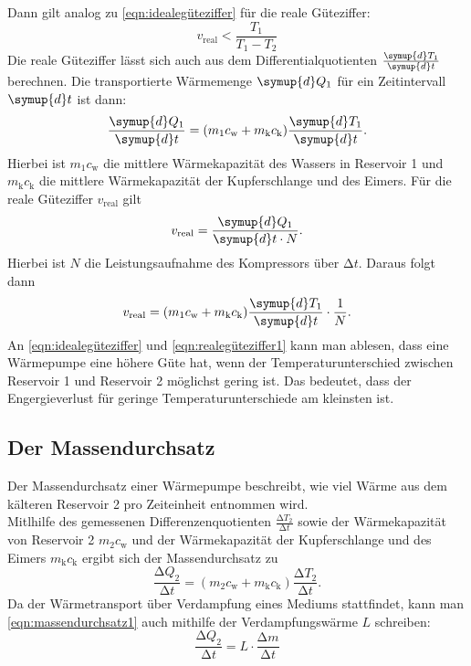 \documentclass{scrartcl} %
\begin{document}
	Dann gilt analog zu \eqref{eqn:idealegüteziffer} für die reale Güteziffer:
	\begin{equation}
		v_\text{real} < \frac{T_\text{1}}{T_\text{1}-T_\text{2}}
		\label{eqn:realegüteziffer1}
	\end{equation}
  Die reale Güteziffer lässt sich auch aus dem Differentialquotienten $ \frac{\symup{d} T_\text{1}}{ \symup{d} t}$ berechnen. Die transportierte Wärmemenge $\symup{d} Q_\text{1}$
  für ein Zeitintervall $\symup{d} t$ ist dann:
  \begin{equation}
    \frac{\symup{d} Q_\text{1}}{\symup{d} t} = (m_\text{1}c_\text{w} + m_\text{k}c_\text{k}) \frac{\symup{d} T_\text{1}}{\symup{d} t}.
    \label{eqn:realegüteziffer2}
  \end{equation}
  Hierbei ist $m_\text{1}c_\text{w}$ die mittlere Wärmekapazität des Wassers in Reservoir 1 und $m_\text{k}c_\text{k}$ die mittlere Wärmekapazität der Kupferschlange und des Eimers.
  Für die reale Güteziffer $v_\text{real}$ gilt
  \begin{equation}
    v_\text{real} = \frac{\symup{d} Q_\text{1}}{\symup{d} t \cdot N}.
  \end{equation}
  Hierbei ist $N$ die Leistungsaufnahme des Kompressors über $\increment t$. Daraus folgt dann
  \begin{equation}
    v_\text{real} = (m_\text{1}c_\text{w} + m_\text{k}c_\text{k}) \frac{\symup{d} T_\text{1}}{\symup{d} t} \cdot \frac{1}{N}.
    \label{eqn:realegüteziffer3}
  \end{equation}
	An \eqref{eqn:idealegüteziffer} und \eqref{eqn:realegüteziffer1} kann man ablesen, dass eine Wärmepumpe eine höhere Güte hat,
	wenn der Temperaturunterschied zwischen Reservoir 1 und Reservoir 2 möglichst gering ist. Das bedeutet, dass der Engergieverlust
	für geringe Temperaturunterschiede am kleinsten ist.
	\subsection{Der Massendurchsatz}
  	Der Massendurchsatz einer Wärmepumpe beschreibt, wie viel Wärme aus dem kälteren Reservoir 2 pro Zeiteinheit entnommen wird. \\
  	Mitlhilfe des gemessenen Differenzenquotienten $ \frac{\increment T_\text{2}}{\increment t}$ sowie der Wärmekapazität von Reservoir 2
  	$m_\text{2}c_\text{w}$ und der Wärmekapazität der Kupferschlange und des Eimers $m_\text{k}c_\text{k}$ ergibt sich der Massendurchsatz
  	zu
  	\begin{equation}
  		\frac{\increment Q_\text{2}}{\increment t} = (m_\text{2} c_\text{w} + m_\text{k} c_\text{k}) \frac{\increment T_\text{2}}{\increment t}.
  		\label{eqn:massendurchsatz1}
  	\end{equation}
  	Da der Wärmetransport über Verdampfung eines Mediums stattfindet, kann man \eqref{eqn:massendurchsatz1} auch mithilfe der
  	Verdampfungswärme $L$ schreiben:
  	\begin{equation}
  		\frac{\increment Q_\text{2}}{\increment t} = L \cdot \frac{\increment m}{\increment t}
  		\label{eqn:massendurchsatz2}
  	\end{equation}
\end{document}
